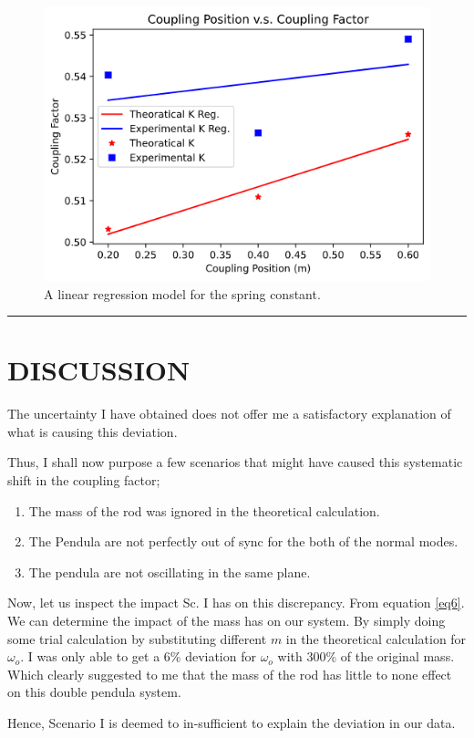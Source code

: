 \documentclass[aps,prl,reprint,10pt,amsmath,amssymb,superscriptaddress,a4paper]{revtex4-2}
\begin{document}
\begin{figure}[H]
    \includegraphics[width = 9 cm]{images/couplingfactor.png}
    \caption{A linear regression model for the spring constant. \label{fig3}}
\end{figure}
\par\noindent\rule{\linewidth}{0.4pt}

\section{DISCUSSION}
The uncertainty I have obtained does not offer me a satisfactory explanation of what is causing this deviation.

Thus, I shall now purpose a few scenarios that might have caused this systematic shift in the coupling factor;
\begin{enumerate}[Sc. I)]
    \item The mass of the rod was ignored in the theoretical calculation.
    \item The Pendula are not perfectly out of sync for the both of the normal modes.
    \item The pendula are not oscillating in the same plane.
\end{enumerate} 

Now, let us inspect the impact Sc. I has on this discrepancy. From equation \eqref{eq6}. We can determine the impact of the mass has on our system. By simply doing some trial calculation by substituting different $m$ in the theoretical calculation for $\omega_o$. I was only able to get a 6\% deviation for $\omega_o$ with 300\% of the original mass. Which clearly suggested to me that the mass of the rod has little to none effect on this double pendula system. 

Hence, Scenario I is deemed to in-sufficient to explain the deviation in our data. 
\end{document}
